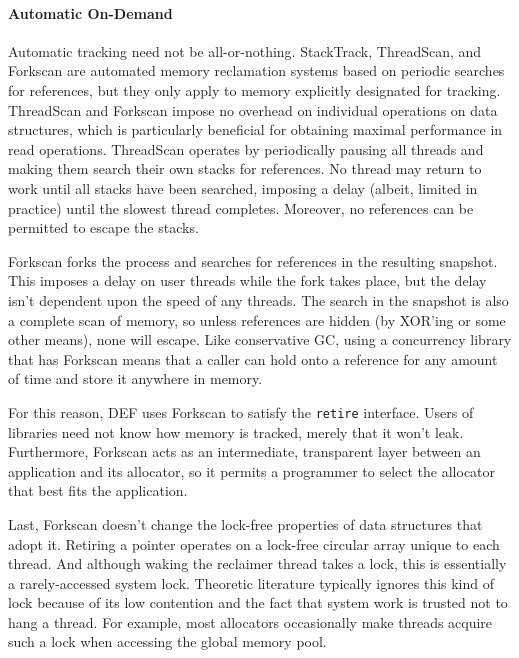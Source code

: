\paragraph{Automatic On-Demand} Automatic tracking need not be all-or-nothing.  StackTrack\cite{StackTrack}, ThreadScan\cite{Threadscan}, and Forkscan\cite{Forkscan} are automated memory reclamation systems based on periodic searches for references, but they only apply to memory explicitly designated for tracking.  ThreadScan and Forkscan impose no overhead on individual operations on data structures, which is particularly beneficial for obtaining maximal performance in read operations.  ThreadScan operates by periodically pausing all threads and making them search their own stacks for references.  No thread may return to work until all stacks have been searched, imposing a delay (albeit, limited in practice) until the slowest thread completes.  Moreover, no references can be permitted to escape the stacks.

Forkscan forks the process and searches for references in the resulting snapshot.  This imposes a delay on user threads while the fork takes place, but the delay isn't dependent upon the speed of any threads.  The search in the snapshot is also a complete scan of memory, so unless references are hidden (by XOR'ing or some other means), none will escape.  Like conservative GC, using a concurrency library that has Forkscan means that a caller can hold onto a reference for any amount of time and store it anywhere in memory.

For this reason, DEF uses Forkscan to satisfy the \texttt{retire} interface.  Users of libraries need not know how memory is tracked, merely that it won't leak.  Furthermore, Forkscan acts as an intermediate, transparent layer between an application and its allocator, so it permits a programmer to select the allocator that best fits the application.

Last, Forkscan doesn't change the lock-free properties of data structures that adopt it.  Retiring a pointer operates on a lock-free circular array unique to each thread.  And although waking the reclaimer thread takes a lock, this is essentially a rarely-accessed system lock.  Theoretic literature typically ignores this kind of lock because of its low contention and the fact that system work is trusted not to hang a thread.  For example, most allocators occasionally make threads acquire such a lock when accessing the global memory pool.
